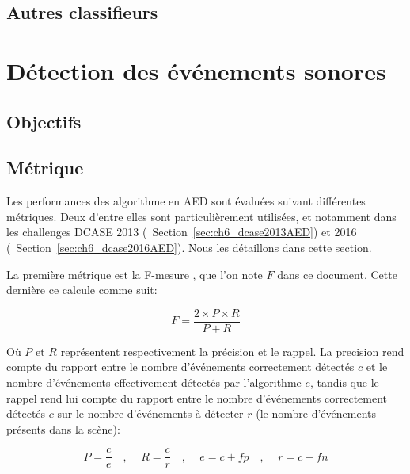 \subsection{Autres classifieurs}
\label{sec:ch6_autresAlgo}


\section{Détection des événements sonores}
\label{sec:ch6_AED}

\subsection{Objectifs}
\label{sec:ch6_objAED}


\subsection{Métrique}
\label{sec:ch6_metriqueAED}

Les performances des algorithme en AED sont évaluées suivant différentes métriques. Deux d'entre elles sont particulièrement utilisées, et notamment dans les challenges DCASE 2013 (\cf~Section~\ref{sec:ch6_dcase2013AED}) et 2016 (\cf~Section~\ref{sec:ch6_dcase2016AED}). Nous les détaillons dans cette section.

La première métrique est la F-mesure \citep{Giannoulis2013database,giannoulis2013detection,Stowell15}, que l'on note $F$ dans ce document. Cette dernière ce calcule comme suit:

\begin{equation}
F=\dfrac{2\times P \times R}{P+R}
\end{equation}

Où $P$ et $R$ représentent respectivement la précision et le rappel. La precision rend compte du rapport entre le nombre d'événements correctement détectés $c$ et le nombre d'événements effectivement détectés par l'algorithme $e$, tandis que le rappel rend lui compte du rapport entre le nombre d'événements correctement détectés $c$ sur le nombre d'événements à détecter $r$ (le nombre d'événements présents dans la scène):

\begin{equation}
P=\dfrac{c}{e}  \quad \textrm{, } \quad R=\dfrac{c}{r} \quad \textrm{, } \quad  e=c+fp \quad \textrm{, } \quad  r=c+fn
\end{equation}

